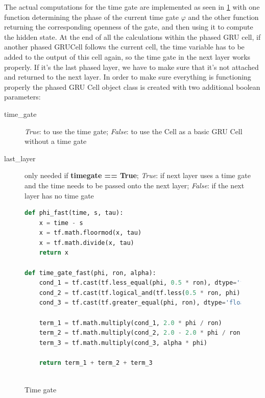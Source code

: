 The actual computations for the time gate are implemented as seen in \ref{fig:time gate} with one function determining the phase of the current time gate $\varphi$ and the other function returning the corresponding openness of the gate, and then using it to compute the hidden state. 
At the end of all the calculations within the phased GRU cell, if another phased GRUCell follows the current cell, the time variable has to be added to the output of this cell again, so the time gate in the next layer works properly. If it's the last phased layer, we have to make sure that it's not attached and returned to the next layer. 
In order to make sure everything is functioning properly the phased GRU Cell object class is created with two additional boolean parameters:
\begin{description}
    \item[time\_gate] \textit{True}: to use the time gate; \textit{False}: to use the Cell as a basic GRU Cell without a time gate
    \item[last\_layer] only needed if \textbf{timegate == True}; \textit{True}: if next layer uses a time gate and the time needs to be passed onto the next layer; \textit{False}: if the next layer has no time gate
\end{description}

\begin{figure}[h]
    \centering
\begin{lstlisting}[language=Python]
def phi_fast(time, s, tau):
    x = time - s
    x = tf.math.floormod(x, tau)
    x = tf.math.divide(x, tau)
    return x

def time_gate_fast(phi, ron, alpha):
    cond_1 = tf.cast(tf.less_equal(phi, 0.5 * ron), dtype='float32')
    cond_2 = tf.cast(tf.logical_and(tf.less(0.5 * ron, phi), tf.less(phi, ron)), dtype='float32')
    cond_3 = tf.cast(tf.greater_equal(phi, ron), dtype='float32')

    term_1 = tf.math.multiply(cond_1, 2.0 * phi / ron)
    term_2 = tf.math.multiply(cond_2, 2.0 - 2.0 * phi / ron)
    term_3 = tf.math.multiply(cond_3, alpha * phi)

    return term_1 + term_2 + term_3
    
\end{lstlisting}
\caption{Time gate}
\label{fig:time gate}
\end{figure}

